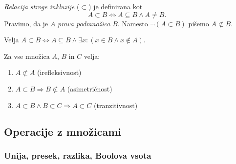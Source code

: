 \documentclass[12pt, a4paper]{article}
\renewcommand{\implies}{\Rightarrow}
\renewcommand{\iff}{\Leftrightarrow}
\begin{document}
\begin{okvir}
\begin{definicija}
\emph{Relacija stroge inkluzije} ($\subset$) je definirana kot
\[
A\subset B\iff A\subseteq B\land A\ne B.
\]
Pravimo, da je $A$ \emph{prava podmnožica} $B$. Namesto $\neg(A\subset B)$ pišemo $A\not\subset B$.
\end{definicija}
\end{okvir}

\begin{trditev}
Velja $A\subset B\iff A\subseteq B\land \exists x\colon(x\in B\land x\not\in A)$.
\end{trditev}

\obvs

\begin{izrek}
Za vse množica $A$, $B$ in $C$ velja:

\begin{enumerate}[label=(\roman*)]
\item $A\not\subset A$ (irefleksivnost)
\item $A\subset B\implies B\not\subset A$ (asimetričnost)
\item $A\subset B\land B\subset C\implies A\subset C$ (tranzitivnost)
\end{enumerate}
\end{izrek}

\obvs

\newpage

\subsection{Operacije z množicami}

\subsubsection{Unija, presek, razlika, Boolova vsota}
\end{document}

